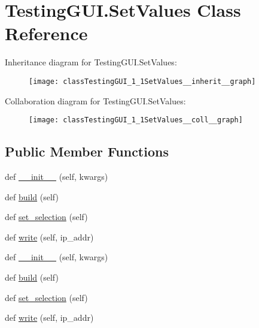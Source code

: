 \hypertarget{classTestingGUI_1_1SetValues}{}\section{Testing\+G\+U\+I.\+Set\+Values Class Reference}
\label{classTestingGUI_1_1SetValues}


Inheritance diagram for Testing\+G\+U\+I.\+Set\+Values\+:
\nopagebreak
\begin{figure}[H]
\begin{center}
\leavevmode
\texttt{[image: classTestingGUI\_1\_1SetValues\_\_inherit\_\_graph]}
\end{center}
\end{figure}


Collaboration diagram for Testing\+G\+U\+I.\+Set\+Values\+:
\nopagebreak
\begin{figure}[H]
\begin{center}
\leavevmode
\texttt{[image: classTestingGUI\_1\_1SetValues\_\_coll\_\_graph]}
\end{center}
\end{figure}
\subsection*{Public Member Functions}
\begin{DoxyCompactItemize}
\item 
def \hyperlink{classTestingGUI_1_1SetValues_a2e5f962d54f1363a133feec2ca79a6f0}{\+\_\+\+\_\+init\+\_\+\+\_\+} (self, kwargs)
\item 
def \hyperlink{classTestingGUI_1_1SetValues_a27a7794b18e735441d0f90568b9b9070}{build} (self)
\item 
def \hyperlink{classTestingGUI_1_1SetValues_a1ac1751244272aadccd6d300ba58f70a}{set\+\_\+selection} (self)
\item 
def \hyperlink{classTestingGUI_1_1SetValues_abf5d39c7e49932e4d2fd545fecc97300}{write} (self, ip\+\_\+addr)
\item 
def \hyperlink{classTestingGUI_1_1SetValues_a2e5f962d54f1363a133feec2ca79a6f0}{\+\_\+\+\_\+init\+\_\+\+\_\+} (self, kwargs)
\item 
def \hyperlink{classTestingGUI_1_1SetValues_a27a7794b18e735441d0f90568b9b9070}{build} (self)
\item 
def \hyperlink{classTestingGUI_1_1SetValues_a1ac1751244272aadccd6d300ba58f70a}{set\+\_\+selection} (self)
\item 
def \hyperlink{classTestingGUI_1_1SetValues_abf5d39c7e49932e4d2fd545fecc97300}{write} (self, ip\+\_\+addr)
\end{DoxyCompactItemize}
